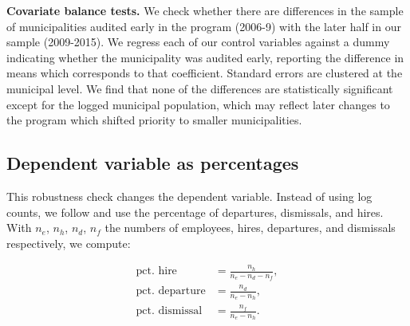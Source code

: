 \documentclass[12pt,a4paper]{article}
\theoremstyle{definition}
\begin{document}
{%
\begin{table}[H]
    
    \caption{\textbf{Covariate balance tests.} We check whether there are differences in the sample of municipalities audited early in the program (2006-9) with the later half in our sample (2009-2015). We regress each of our control variables against a dummy indicating whether the municipality was audited early, reporting the difference in means which corresponds to that coefficient. Standard errors are clustered at the municipal level. We find that none of the differences are statistically significant except for the logged municipal population, which may reflect later changes to the program which shifted priority to smaller municipalities.}
    \label{tbl:balance}
\end{table}

\subsection{Dependent variable as percentages}
\label{app:percentageRobustness}

This robustness check changes the dependent variable. Instead of using log counts, we follow \citet{poulsen2019corruption} and use the percentage of departures, dismissals, and hires. With $n_e$, $n_h$, $n_d$, $n_f$ the numbers of employees, hires, departures, and dismissals respectively, we compute:

\begin{align*}
    \text{pct. hire} &= \frac{n_h}{n_e - n_d - n_f}, \\ 
    \text{pct. departure} &= \frac{n_d}{n_e - n_h}, \\
    \text{pct. dismissal} &= \frac{n_f}{n_e - n_h}. 
\end{align*}

}
\end{document}

